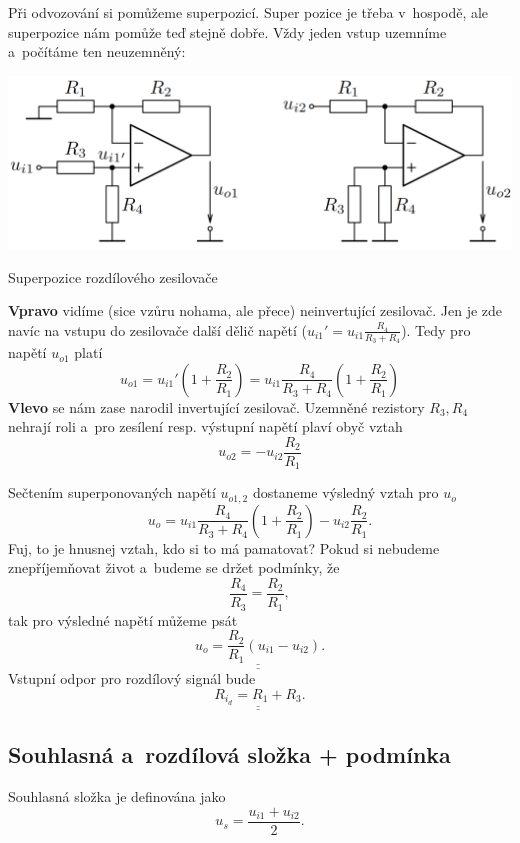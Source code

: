 \documentclass[a4paper,12pt]{article}   %
\begin{document}
Při odvozování si pomůžeme superpozicí. Super pozice je třeba v~hospodě, ale superpozice nám pomůže teď stejně dobře. Vždy jeden vstup uzemníme a~počítáme ten neuzemněný:
\begin{schema}[h!]
    \centering
    \includegraphics[height=.25\linewidth]{rozdilovy-zesilovac-oz-superpozice.PNG}
    \caption{Superpozice rozdílového zesilovače}
\end{schema}
\textbf{Vpravo} vidíme (sice vzůru nohama, ale přece) neinvertující zesilovač. Jen je zde navíc na vstupu do zesilovače další dělič napětí ($u_{i1}' = u_{i1}\frac{R_4}{R_3 + R_4}$). Tedy pro napětí $u_{o1}$ platí 
\begin{equation*}
    u_{o1} = u_{i1}'\left(1+\frac{R_2}{R_1}\right) = u_{i1}\frac{R_4}{R_3+R_4}\left(1+\frac{R_2}{R_1}\right)
\end{equation*}
\textbf{Vlevo} se nám zase narodil invertující zesilovač. Uzemněné rezistory $R_3, R_4$ nehrají roli a~pro zesílení resp. výstupní napětí plaví obyč vztah
\begin{equation*}
    u_{o2} = -u_{i2}\frac{R_2}{R_1}
\end{equation*}

Sečtením superponovaných napětí $u_{o1,2}$ dostaneme výsledný vztah pro $u_o$
\begin{equation}
    u_o = u_{i1}\frac{R_4}{R_3+R_4}\left(1+\frac{R_2}{R_1}\right)-u_{i2}\frac{R_2}{R_1}.
\end{equation}
Fuj, to je hnusnej vztah, kdo si to má pamatovat? Pokud si nebudeme znepříjemňovat život a~budeme se držet podmínky, že
\begin{equation*}
    \frac{R_4}{R_3} = \frac{R_2}{R_1},
\end{equation*}
tak pro výsledné napětí můžeme psát
\begin{equation}
    \underline{\underline{u_o = \frac{R_2}{R_1}(u_{i1}-u_{i2})}}.
\end{equation}
Vstupní odpor pro rozdílový signál bude
\begin{equation}
    \underline{\underline{R_{i_d} = R_1 + R_3}}.
\end{equation}


\subsection*{Souhlasná a~rozdílová složka + podmínka}
Souhlasná složka je definována jako
\begin{equation*}
    u_s = \frac{u_{i1} + u_{i2}}{2}.
\end{equation*}
\end{document}
